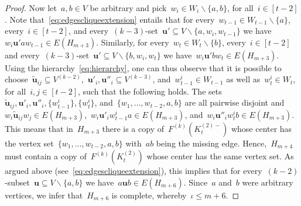 \documentclass[10pt,a4paper]{amsart}
\let\setminus=\smallsetminus
\let\setminus=\smallsetminus
\begin{document}
\begin{proof}
        Now let~$a,b\in V$ be arbitrary and pick~$w_i\in W_i\setminus\{a,b\}$, for all~$i\in[t-2]$.
		Note that~\eqref{eq:edgescliqueextension} entails that for every~$w_{t-1}\in W_{t-1}\setminus\{a\}$, every~$i\in[t-2]$, and every~$(k-3)$-set~$\mathbf{u'}\subseteq V\setminus\{a,w_i,w_{t-1}\}$ we have~$w_i\mathbf{u'}aw_{t-1}\in E(H_{m+3})$.
		Similarly, for every~$w_t\in W_t\setminus\{b\}$, every~$i\in[t-2]$ and every~$(k-3)$-set~$\mathbf{u'}\subseteq V\setminus\{b,w_i,w_t\}$ we have~$w_i\mathbf{u'}bw_t\in E(H_{m+3})$.
		Using the hierarchy~\eqref{eq:hierarchy}, one can thus observe that it is possible to choose~$\widetilde{\mathbf{u}}_{ij}\subseteq V^{(k-2)}$,~$\mathbf{u}'_i,\mathbf{u}''_i\subseteq V^{(k-3)}$, and~$w_{t-1}^i\in W_{t-1}$ as well as~$w_t^i\in W_t$, for all~$i,j\in[t-2]$, such that the following holds.
        The sets~$\widetilde{\mathbf{u}}_{ij},\mathbf{u}'_i,\mathbf{u}''_i,\{w_{t-1}^i\},\{w_t^i\}$, and~$\{w_1,\dots,w_{t-2},a,b\}$ are all pairwise disjoint and~$w_i\widetilde{\mathbf{u}}_{ij}w_j\in E(H_{m+3})$,~$w_i\mathbf{u}'_iw_{t-1}^ia\in E(H_{m+3})$, and~$w_i\mathbf{u}''_iw_t^ib\in E(H_{m+3})$.
        This means that in~$H_{m+3}$ there is a copy of~$F^{(k)}(K_t^{(2)-})$ whose center has the vertex set~$\{w_1,\dots,w_{t-2},a,b\}$ with~$ab$ being the missing edge.
		Hence,~$H_{m+4}$ must contain a copy of~$F^{(k)}(K_t^{(2)})$ whose center has the same vertex set.
		As argued above (see~\eqref{eq:edgescliqueextension}), this implies that for every~$(k-2)$-subset~$\mathbf{u}\subseteq V\setminus\{a,b\}$ we have~$a\mathbf{u}b\in E(H_{m+6})$.
		Since~$a$ and~$b$ were arbitrary vertices, we infer that~$H_{m+6}$ is complete, whereby~$\iota\leq m+6$.
	\end{proof}
\end{document}
